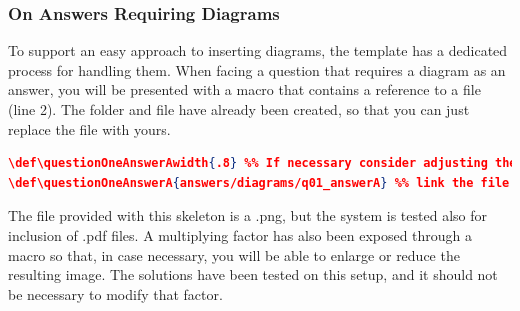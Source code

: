 \subsubsection*{On Answers Requiring Diagrams}
To support an easy approach to inserting diagrams, the template has a dedicated process for handling them.  When facing a question that requires a diagram as an answer, you will be presented with a macro that contains a reference to a file (line 2).  The folder and file have already been created, so that you can just replace the file with yours.  
\begin{lstlisting}[language=json,basicstyle=\ttfamily\footnotesize,numbersep=5pt,frame=trBL,framexleftmargin=1.5em]
\def\questionOneAnswerAwidth{.8} %% If necessary consider adjusting the multiplying factor
\def\questionOneAnswerA{answers/diagrams/q01_answerA} %% link the file containing the diagram
\end{lstlisting}

The file provided with this skeleton is a .png, but the system is tested also for inclusion of .pdf files.  A multiplying factor has also been exposed through a macro so that, in case necessary, you will be able to enlarge or reduce the resulting image.  The solutions have been tested on this setup, and it should not be necessary to modify that factor.

